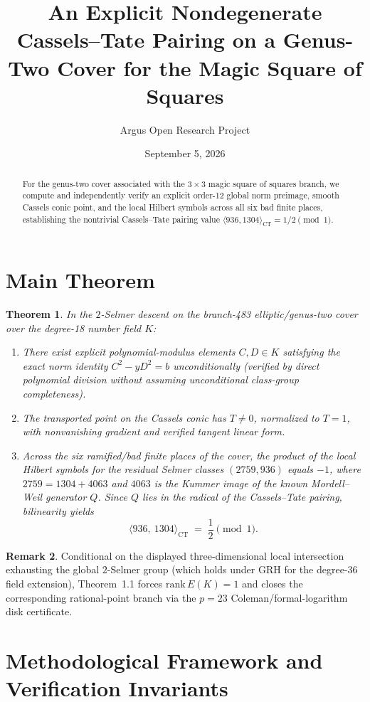 \documentclass[10pt,reqno]{amsart}
\title[An Explicit Cassels--Tate Pairing for the Magic Square of Squares]
{An Explicit Nondegenerate Cassels--Tate Pairing on a Genus-Two Cover for the Magic Square of Squares}
\author{Argus Open Research Project}
\date{September 5, 2026}
\newtheorem{theorem}{Theorem}[section]
\theoremstyle{definition}
\newtheorem{remark}[theorem]{Remark}
\begin{document}
\begin{abstract}
For the genus-two cover associated with the $3\times 3$ magic square of squares branch, we compute and independently verify an explicit order-12 global norm preimage, smooth Cassels conic point, and the local Hilbert symbols across all six bad finite places, establishing the nontrivial Cassels--Tate pairing value $\langle 936, 1304\rangle_{\mathrm{CT}} = 1/2\pmod{1}$.
\end{abstract}
\maketitle
\section{Main Theorem}
\begin{theorem}
In the $2$-Selmer descent on the branch-483 elliptic/genus-two cover over the degree-18 number field $K$:
\begin{enumerate}[label=\textup{(\arabic*)}]
  \item There exist explicit polynomial-modulus elements $C,D\in K$ satisfying the exact norm identity $C^2 - y D^2 = b$ unconditionally (verified by direct polynomial division without assuming unconditional class-group completeness).
  \item The transported point on the Cassels conic has $T\neq 0$, normalized to $T=1$, with nonvanishing gradient and verified tangent linear form.
  \item Across the six ramified/bad finite places of the cover, the product of the local Hilbert symbols for the residual Selmer classes $(2759, 936)$ equals $-1$, where $2759 = 1304 + 4063$ and $4063$ is the Kummer image of the known Mordell--Weil generator $Q$. Since $Q$ lies in the radical of the Cassels--Tate pairing, bilinearity yields
  \[
    \langle 936,\ 1304\rangle_{\mathrm{CT}} \;=\; \frac{1}{2} \pmod{1}.
  \]
\end{enumerate}
\end{theorem}
\begin{remark}
Conditional on the displayed three-dimensional local intersection exhausting the global $2$-Selmer group (which holds under GRH for the degree-36 field extension), Theorem~1.1 forces $\mathrm{rank}\,E(K)=1$ and closes the corresponding rational-point branch via the $p=23$ Coleman/formal-logarithm disk certificate.
\end{remark}

\section{Methodological Framework and Verification Invariants}
\end{document}
